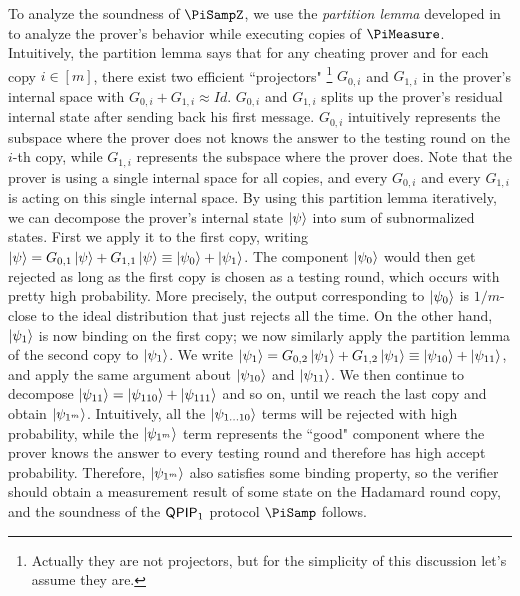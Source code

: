 
To analyze the soundness of $\PiSampZ$, we use the \emph{partition lemma} developed in~\cite{arXiv:ChiaChungYam19} to analyze the prover's behavior while executing copies of $\PiMeasure$. Intuitively, the partition lemma says that for any cheating prover and for each copy $i\in[m]$, there exist two efficient ``projectors" \footnote{Actually they are not projectors, but for the simplicity of this discussion let's assume they are.} $G_{0,i}$ and $G_{1,i}$ in the prover's internal space with $G_{0,i}+G_{1,i} \approx Id$. $G_{0,i}$ and $G_{1,i}$ splits up the prover's residual internal state after sending back his first message.
$G_{0,i}$ intuitively represents the subspace where the prover does not knows the answer to the testing round on the $i$-th copy, while $G_{1,i}$ represents the subspace where the prover does. Note that the prover is using a single internal space for all copies, and every $G_{0,i}$ and every $G_{1,i}$ is acting on this single internal space. 
By using this partition lemma iteratively, we can decompose the prover's internal state $\ket{\psi}$ into sum of subnormalized states.
First we apply it to the first copy, writing $\ket{\psi}=G_{0,1}\ket{\psi}+G_{1,1}\ket{\psi} \equiv \ket{\psi_0}+\ket{\psi_1}$.
The component $\ket{\psi_0}$ would then get rejected as long as the first copy is chosen as a testing round,
which occurs with pretty high probability.
More precisely, the output corresponding to $\ket{\psi_0}$ is $1/m$-close to the ideal distribution that just rejects all the time.
On the other hand, $\ket{\psi_1}$ is now binding on the first copy;
we now similarly apply the partition lemma of the second copy to $\ket{\psi_1}$.
We write $\ket{\psi_1}=G_{0,2}\ket{\psi_1}+G_{1,2}\ket{\psi_1}\equiv \ket{\psi_{10}}+\ket{\psi_{11}}$, and apply the same argument about $\ket{\psi_{10}}$ and $\ket{\psi_{11}}$.
We then continue to decompose $\ket{\psi_{11}}=\ket{\psi_{110}}+\ket{\psi_{111}}$ and so on, until we reach the last copy and obtain $\ket{\psi_{1^m}}$.
Intuitively, all the $\ket{\psi_{1\dots10}}$ terms will be rejected with high probability, while the $\ket{\psi_{1^m}}$ term represents the ``good" component where the prover knows the answer to every testing round and therefore has high accept probability. Therefore, $\ket{\psi_{1^m}}$ also satisfies some binding property,
so the verifier should obtain a measurement result of some state on the Hadamard round copy,
and the soundness of the $\operatorname{\mathsf{QPIP}}_1$ protocol $\PiSamp$ follows.

